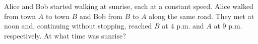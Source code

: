 Alice and Bob started walking at sunrise, each at a constant speed. Alice walked from town $A$ to town $B$ and Bob from $B$ to $A$ along the same road. They met at noon and, continuing without stopping, reached $B$ at $4$ p.m. and $A$ at $9$ p.m. respectively. At what time was sunrise?
